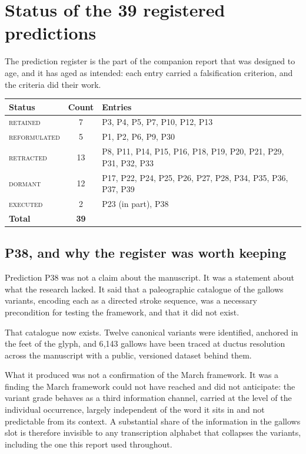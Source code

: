 \documentclass[11pt,a4paper]{article}
\newcommand{\keep}{\textsc{retained}}
\newcommand{\reform}{\textsc{reformulated}}
\newcommand{\retract}{\textcolor{red!65!black}{\textsc{retracted}}}
\newcommand{\dormant}{\textsc{dormant}}
\newcommand{\executed}{\textcolor{green!35!black}{\textsc{executed}}}
\begin{document}
\section{Status of the 39 registered predictions}

The prediction register is the part of the companion report that was designed to age, and it has
aged as intended: each entry carried a falsification criterion, and the criteria did their work.

\begin{center}
\begin{tabular}{@{}lcl@{}}
\toprule
\textbf{Status} & \textbf{Count} & \textbf{Entries} \\
\midrule
\keep{}     & 7  & P3, P4, P5, P7, P10, P12, P13 \\
\reform{}   & 5  & P1, P2, P6, P9, P30 \\
\retract{}  & 13 & P8, P11, P14, P15, P16, P18, P19, P20, P21, P29, P31, P32, P33 \\
\dormant{}  & 12 & P17, P22, P24, P25, P26, P27, P28, P34, P35, P36, P37, P39 \\
\executed{} & 2  & P23 (in part), P38 \\
\midrule
\textbf{Total} & \textbf{39} & \\
\bottomrule
\end{tabular}
\end{center}

\subsection*{P38, and why the register was worth keeping}

Prediction P38 was not a claim about the manuscript. It was a statement about what the research
lacked. It said that a paleographic catalogue of the gallows variants, encoding each as a directed
stroke sequence, was a necessary precondition for testing the framework, and that it did not exist.

That catalogue now exists. Twelve canonical variants were identified, anchored in the feet of the
glyph, and 6{,}143 gallows have been traced at ductus resolution across the manuscript with a
public, versioned dataset behind them.

What it produced was not a confirmation of the March framework. It was a finding the March
framework could not have reached and did not anticipate: the variant grade behaves as a third
information channel, carried at the level of the individual occurrence, largely independent of the
word it sits in and not predictable from its context. A substantial share of the information in the
gallows slot is therefore invisible to any transcription alphabet that collapses the variants,
including the one this report used throughout.
\end{document}
